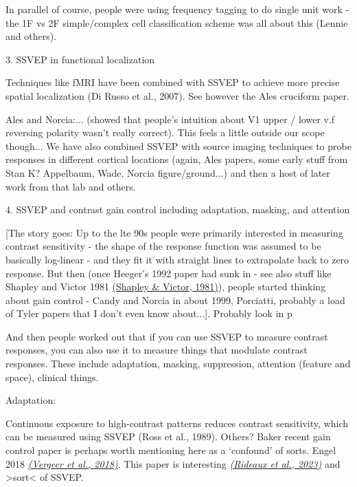 \documentclass[
  letterpaper,
  DIV=11,
  numbers=noendperiod]{scrartcl}
\begin{document}
In parallel of course, people were using frequency tagging to do single
unit work - the 1F vs 2F simple/complex cell classification scheme was
all about this (Lennie and others).

\label{anchor-5}{}3. SSVEP in functional localization

Techniques like fMRI have been combined with SSVEP to achieve more
precise spatial localization (Di Russo et al., 2007). See however the
Ales cruciform paper.

Ales and Norcia:... (showed that people's intuition about V1 upper /
lower v.f reversing polarity wasn't really correct). This feels a little
outside our scope though... We have also combined SSVEP with source
imaging techniques to probe responses in different cortical locations
(again, Ales papers, some early stuff from Stan K? Appelbaum, Wade,
Norcia figure/ground...) and then a host of later work from that lab and
others.

\label{anchor-6}{}4. SSVEP and contrast gain control
including adaptation, masking, and attention

{[}The story goes: Up to the lte 90s people were primarily interested in
measuring contrast sensitivity - the shape of the response function was
assumed to be basically log-linear - and they fit it with straight lines
to extrapolate back to zero response. But then (once Heeger's 1992 paper
had sunk in - see also stuff like Shapley and Victor 1981
\href{https://www.zotero.org/google-docs/?zAmtgj}{(Shapley \& Victor,
1981)}), people started thinking about gain control - Candy and Norcia
in about 1999, Porciatti, probably a load of Tyler papers that I don't
even know about...{]}. Probably look in p

And then people worked out that if you can use SSVEP to measure contrast
responses, you can also use it to measure things that modulate contrast
responses. These include adaptation, masking, suppression, attention
(feature and space), clinical things.

\label{anchor-7}{}Adaptation:

Continuous exposure to high-contrast patterns reduces contrast
sensitivity, which can be measured using SSVEP (Ross et al., 1989).
Others? Baker recent gain control paper is perhaps worth mentioning here
as a `confound' of sorts. Engel 2018
\href{https://www.zotero.org/google-docs/?kdURiS}{\emph{(Vergeer et al.,
2018)}}. This paper is interesting
\href{https://www.zotero.org/google-docs/?J2EO3d}{\emph{(Rideaux et al.,
2023)}} and \textgreater sort\textless{} of SSVEP.
\end{document}
